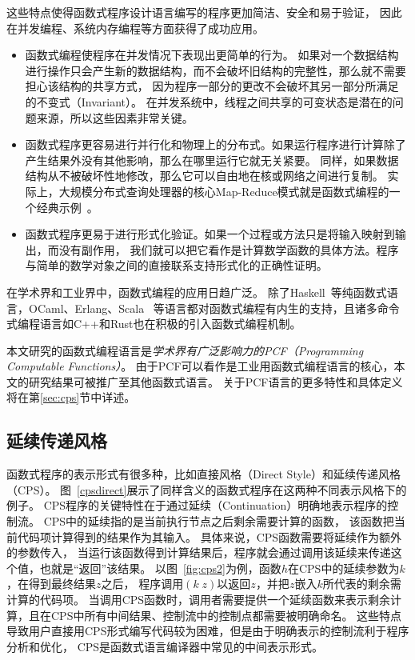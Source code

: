 这些特点使得函数式程序设计语言编写的程序更加简洁、安全和易于验证，
因此在并发编程、系统内存编程等方面获得了成功应用。
\begin{itemize}
    \item 函数式编程使程序在并发情况下表现出更简单的行为。
    如果对一个数据结构进行操作只会产生新的数据结构，而不会破坏旧结构的完整性，那么就不需要担心该结构的共享方式，
    因为程序一部分的更改不会破坏其另一部分所满足的不变式（Invariant）。
    在并发系统中，线程之间共享的可变状态是潜在的问题来源，所以这些因素非常关键。
    \item 函数式程序更容易进行并行化和物理上的分布式。如果运行程序进行计算除了产生结果外没有其他影响，那么在哪里运行它就无关紧要。
    同样，如果数据结构从不被破坏性地修改，那么它可以自由地在核或网络之间进行复制。
    实际上，大规模分布式查询处理器的核心Map-Reduce模式就是函数式编程的一个经典示例~\cite{chu2006map}。
    \item 函数式程序更易于进行形式化验证。如果一个过程或方法只是将输入映射到输出，而没有副作用，
    我们就可以把它看作是计算数学函数的具体方法。程序与简单的数学对象之间的直接联系支持形式化的正确性证明。
\end{itemize}

在学术界和工业界中，函数式编程的应用日趋广泛。
除了Haskell~\cite{o2008real}等纯函数式语言，OCaml、Erlang、Scala~\cite{cesarini2009erlang, odersky2014unifying}
等语言都对函数式编程有内生的支持，且诸多命令式编程语言如C++和Rust也在积极的引入函数式编程机制。

本文研究的函数式编程语言是\textit{学术界有广泛影响力的PCF（Programming Computable Functions）}。
由于PCF可以看作是工业用函数式编程语言的核心，本文的研究结果可被推广至其他函数式语言。
关于PCF语言的更多特性和具体定义将在第\ref{sec:cps}节中详述。

\subsection{延续传递风格} \label{sec:bg_cps}

函数式程序的表示形式有很多种，比如直接风格（Direct Style）和延续传递风格（CPS）。
图~\ref{cpsdirect}展示了同样含义的函数式程序在这两种不同表示风格下的例子。
CPS程序的关键特性在于通过延续（Continuation）明确地表示程序的控制流。
CPS中的延续指的是当前执行节点之后剩余需要计算的函数，
该函数把当前代码项计算得到的结果作为其输入。
具体来说，CPS函数需要将延续作为额外的参数传入，
当运行该函数得到计算结果后，程序就会通过调用该延续来传递这个值，也就是``返回''该结果。
以图~\ref{fig:cps2}为例，函数$h$在CPS中的延续参数为$k$，在得到最终结果$z$之后，
程序调用$(k\; z)$以返回$z$，并把$z$嵌入$k$所代表的剩余需计算的代码项。
当调用CPS函数时，调用者需要提供一个延续函数来表示剩余计算，且在CPS中所有中间结果、控制流中的控制点都需要被明确命名。
这些特点导致用户直接用CPS形式编写代码较为困难，但是由于明确表示的控制流利于程序分析和优化，
CPS是函数式语言编译器中常见的中间表示形式。

